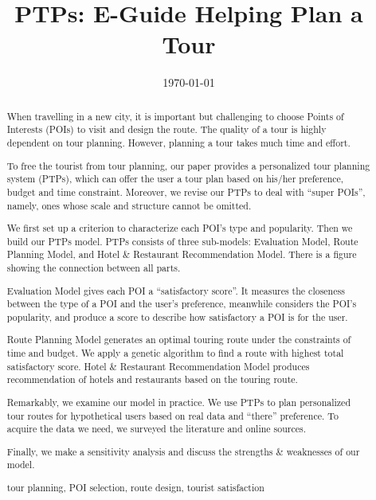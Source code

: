 \documentclass{mcmthesis}
\begin{document}
\linespread{0.6}
\setlength{\parskip}{0.5\baselineskip}
\title{PTPs: E-Guide Helping Plan a Tour}%

\date{\today}
\begin{abstract}
    When travelling in a new city, it is important but challenging to choose Points of Interests (POIs) to visit and design the route. The quality of a tour is highly dependent on tour planning. However, planning a tour takes much time and effort. \par
  To free the tourist from tour planning, our paper provides a personalized tour planning system (PTPs), which can offer the user a tour plan based on his/her preference, budget and time constraint. Moreover, we revise our PTPs to deal with ``super POIs'', namely, ones whose scale and structure cannot be omitted. \par
  We first set up a criterion to characterize each POI's type and popularity. Then we build our PTPs model. PTPs consists of three sub-models: Evaluation Model, Route Planning Model, and Hotel \& Restaurant Recommendation Model. There is a figure showing the connection between all parts.\par
  Evaluation Model gives each POI a ``satisfactory score''. It measures the closeness between the type of a POI and the user's preference, meanwhile considers the POI's popularity, and produce a score to describe how satisfactory a POI is for the user.\par
  Route Planning Model generates an optimal touring route under the constraints of time and budget. We apply a genetic algorithm to find a route with highest total satisfactory score. Hotel \& Restaurant Recommendation Model produces recommendation of hotels and restaurants based on the touring route. \par
  Remarkably, we examine our model in practice. We use PTPs to plan personalized tour routes for hypothetical users based on real data and ``there'' preference. To acquire the data we need, we surveyed the literature and online sources. \par
  Finally, we make a sensitivity analysis and discuss the strengths \& weaknesses of our model.
	\begin{keywords}
    tour planning, POI selection, route design, tourist satisfaction
	\end{keywords}
\end{abstract}

\maketitle
\tableofcontents
\end{document}
